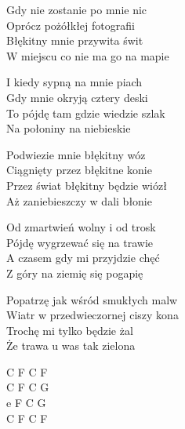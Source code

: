 \begin{text}
    Gdy nie zostanie po mnie nic\\
    Oprócz pożółkłej fotografii\\
    Błękitny mnie przywita świt	\\
    W miejscu co nie ma go na mapie

    I kiedy sypną na mnie piach\\
    Gdy mnie okryją cztery deski\\
    To pójdę tam gdzie wiedzie szlak\\
    Na połoniny na niebieskie

    Podwiezie mnie błękitny wóz\\
    Ciągnięty przez błękitne konie\\
    Przez świat błękitny będzie wiózł\\
    Aż zaniebieszczy w dali błonie

    Od zmartwień wolny i od trosk\\
    Pójdę wygrzewać się na trawie\\
    A czasem gdy mi przyjdzie chęć\\
    Z góry na ziemię się pogapię

    Popatrzę jak wśród smukłych malw\\
    Wiatr w przedwieczornej ciszy kona\\
    Trochę mi tylko będzie żal\\
    Że trawa u was tak zielona
\end{text}
\begin{chord}
    C F C F\\
    C F C G\\
    e F C G\\
    C F C F
\end{chord}